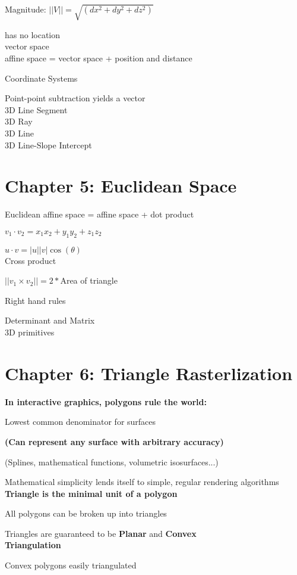 \documentclass[]{report}
\begin{document}
Magnitude: $||V|| = \sqrt{(dx^2+dy^2+dz^2)}$

has no location\\
vector space\\ 
affine space = vector space + position and distance

Coordinate Systems

Point-point subtraction yields a vector\\
3D Line Segment\\
3D Ray\\
3D Line\\
3D Line-Slope Intercept


\section*{Chapter 5: Euclidean Space}
Euclidean affine space = affine space + dot product

$v_1 \cdot v_2 = x_1x_2 + y_1y_2 + z_1z_2$

$u \cdot v = |u||v|\cos(\theta)$\\
Cross product

$||v_1 \times v_2|| = 2 * $Area of triangle

Right hand rules

Determinant and Matrix\\
3D primitives\\


\section*{Chapter 6: Triangle Rasterlization}
\textbf{In interactive graphics, polygons rule the world:}

Lowest common denominator for surfaces

\textbf{(Can represent any surface with arbitrary accuracy)}

(Splines, mathematical functions, volumetric isosurfaces...)

Mathematical simplicity lends itself to simple, regular
rendering algorithms\\
\textbf{Triangle is the minimal unit of a polygon}

All polygons can be broken up into
triangles

Triangles are guaranteed to be \textbf{Planar} and \textbf{Convex}\\
\textbf{Triangulation}

Convex polygons easily
triangulated
\end{document}
